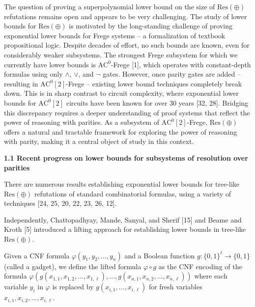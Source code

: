 The question of proving a superpolynomial lower bound on the size of $\mathrm{Res}(\oplus)$ refutations remains open
and appears to be very challenging.
The study of lower bounds for $\operatorname{\mathrm{Res}(\oplus)}$ is motivated by the long-standing challenge of proving exponential
lower bounds for Frege systems – a formalization of textbook propositional logic.
Despite decades of effort, no such bounds are known, even for considerably weaker subsystems.
The strongest Frege subsystem for which we currently have lower bounds is $\mathrm{AC}^{0}$-Frege [1],
which operates with constant-depth formulas using only $\land$, $\lor$, and $\lnot$ gates.
However, once parity gates are added – resulting in $\mathrm{AC}^{0}[2]$-Frege – existing lower bound
techniques completely break down.
This is in sharp contrast to circuit complexity, where exponential lower bounds for $\mathrm{AC}^{0}[2]$
circuits have been known for over 30 years [32, 28].
Bridging this discrepancy requires a
deeper understanding of proof systems that reflect the power of reasoning with parities.
As a subsystem of $\mathrm{AC}^{0}[2]$-Frege, $\operatorname{\mathrm{Res}(\oplus)}$ offers a natural and tractable framework for exploring
the power of reasoning with parity, making it a central object of study in this context.\par


\par\medskip\noindent\textbf{
1.1 Recent progress on lower bounds for subsystems of resolution over parities}\par


There are numerous results establishing exponential lower bounds for tree-like $\mathrm{Res}(\oplus)$ refutations of
standard combinatorial formulas, using a variety of techniques [24, 25, 20, 22, 23, 26, 12].\par



Independently, Chattopadhyay, Mande, Sanyal, and Sherif [15] and Beame and Kroth [5] introduced
a lifting approach for establishing lower bounds in tree-like $\mathrm{Res}(\oplus)$.\par



Given a CNF formula $\varphi(y_{1},y_{2},\dots,y_{n})$ and a Boolean function
$g:\{0,1\}^{\ell}\to\{0,1\}$ (called a gadget), we define the
lifted formula $\varphi\circ g$ as the CNF encoding of the formula
$\varphi(g(x_{1,1},x_{1,2},\dots,x_{1,\ell}),\dots,g(x_{n,1},x_{n,2},\dots,x_{n,\ell}))$ where each variable $y_{i}$ in $\varphi$ is replaced by
$g(x_{i,1},\dots,x_{i,\ell})$ for fresh variables $x_{i,1},x_{i,2},\dots,x_{i,\ell}$.\par



